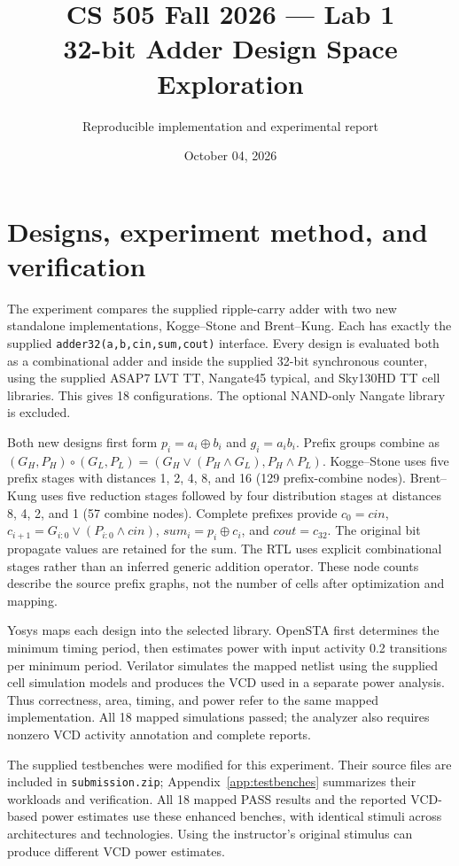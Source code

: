 \documentclass[10pt,letterpaper]{article}
\title{CS 505 Fall 2026 --- Lab 1\\32-bit Adder Design Space Exploration}
\author{Reproducible implementation and experimental report}
\date{October 04, 2026}
\begin{document}
\maketitle

\section{Designs, experiment method, and verification}
The experiment compares the supplied ripple-carry adder with two new standalone
implementations, Kogge--Stone and Brent--Kung. Each has exactly the supplied
\texttt{adder32(a,b,cin,sum,cout)} interface. Every design is evaluated both as a
combinational adder and inside the supplied 32-bit synchronous counter, using
the supplied ASAP7 LVT TT, Nangate45 typical, and Sky130HD TT cell libraries.
This gives 18 configurations. The optional NAND-only Nangate library is excluded.

Both new designs first form $p_i=a_i\oplus b_i$ and $g_i=a_i b_i$.
Prefix groups combine as $(G_H,P_H)\circ(G_L,P_L)=
(G_H\lor(P_H\land G_L),P_H\land P_L)$.
Kogge--Stone uses five prefix stages with distances 1, 2, 4, 8, and 16
(129 prefix-combine nodes). Brent--Kung uses five reduction stages followed by
four distribution stages at distances 8, 4, 2, and 1 (57 combine nodes).
Complete prefixes provide $c_0=cin$, $c_{i+1}=G_{i:0}\lor(P_{i:0}\land cin)$,
$sum_i=p_i\oplus c_i$, and $cout=c_{32}$. The original bit propagate values are
retained for the sum. The RTL uses explicit combinational stages rather than
an inferred generic addition operator. These node counts describe the source
prefix graphs, not the number of cells after optimization and mapping.

Yosys maps each design into the selected library. OpenSTA first determines
the minimum timing period, then estimates power with input activity 0.2
transitions per minimum period. Verilator simulates the mapped netlist using
the supplied cell simulation models and produces the VCD used in a separate
power analysis. Thus correctness, area, timing, and power refer to the same
mapped implementation. All 18 mapped simulations passed; the analyzer also
requires nonzero VCD activity annotation and complete reports.

The supplied testbenches were modified for this experiment. Their source files
are included in \texttt{submission.zip}; Appendix~\ref{app:testbenches}
summarizes their workloads and verification. All 18 mapped PASS results and the reported
VCD-based power estimates use these enhanced benches, with identical stimuli
across architectures and technologies. Using the instructor's original
stimulus can produce different VCD power estimates.
\end{document}
